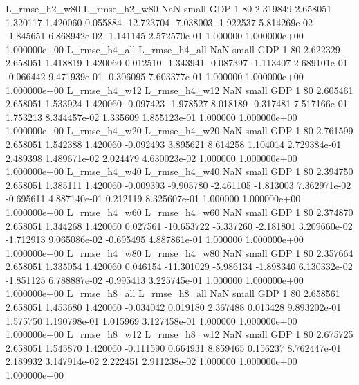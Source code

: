  L_rmse_h2_w80  L_rmse_h2_w80                   NaN      small      GDP                 1 80 2.319849       2.658051 1.320117       1.420060    0.055884    -12.723704     -7.038003    -1.922537   5.814269e-02 -1.845651 6.868942e-02    -1.141145   2.572570e-01            1.000000    1.000000e+00        1.000000e+00
 L_rmse_h4_all  L_rmse_h4_all                   NaN      small      GDP                 1 80 2.622329       2.658051 1.418819       1.420060    0.012510     -1.343941     -0.087397    -1.113407   2.689101e-01 -0.066442 9.471939e-01    -0.306095   7.603377e-01            1.000000    1.000000e+00        1.000000e+00
 L_rmse_h4_w12  L_rmse_h4_w12                   NaN      small      GDP                 1 80 2.605461       2.658051 1.533924       1.420060   -0.097423     -1.978527      8.018189    -0.317481   7.517166e-01  1.753213 8.344457e-02     1.335609   1.855123e-01            1.000000    1.000000e+00        1.000000e+00
 L_rmse_h4_w20  L_rmse_h4_w20                   NaN      small      GDP                 1 80 2.761599       2.658051 1.542388       1.420060   -0.092493      3.895621      8.614258     1.104014   2.729384e-01  2.489398 1.489671e-02     2.024479   4.630023e-02            1.000000    1.000000e+00        1.000000e+00
 L_rmse_h4_w40  L_rmse_h4_w40                   NaN      small      GDP                 1 80 2.394750       2.658051 1.385111       1.420060   -0.009393     -9.905780     -2.461105    -1.813003   7.362971e-02 -0.695611 4.887140e-01     0.212119   8.325607e-01            1.000000    1.000000e+00        1.000000e+00
 L_rmse_h4_w60  L_rmse_h4_w60                   NaN      small      GDP                 1 80 2.374870       2.658051 1.344268       1.420060    0.027561    -10.653722     -5.337260    -2.181801   3.209660e-02 -1.712913 9.065086e-02    -0.695495   4.887861e-01            1.000000    1.000000e+00        1.000000e+00
 L_rmse_h4_w80  L_rmse_h4_w80                   NaN      small      GDP                 1 80 2.357664       2.658051 1.335054       1.420060    0.046154    -11.301029     -5.986134    -1.898340   6.130332e-02 -1.851125 6.788887e-02    -0.995413   3.225745e-01            1.000000    1.000000e+00        1.000000e+00
 L_rmse_h8_all  L_rmse_h8_all                   NaN      small      GDP                 1 80 2.658561       2.658051 1.453680       1.420060   -0.034042      0.019180      2.367488     0.013428   9.893202e-01  1.575750 1.190798e-01     1.015969   3.127458e-01            1.000000    1.000000e+00        1.000000e+00
 L_rmse_h8_w12  L_rmse_h8_w12                   NaN      small      GDP                 1 80 2.675725       2.658051 1.545870       1.420060   -0.111590      0.664931      8.859465     0.156237   8.762447e-01  2.189932 3.147914e-02     2.222451   2.911238e-02            1.000000    1.000000e+00        1.000000e+00
